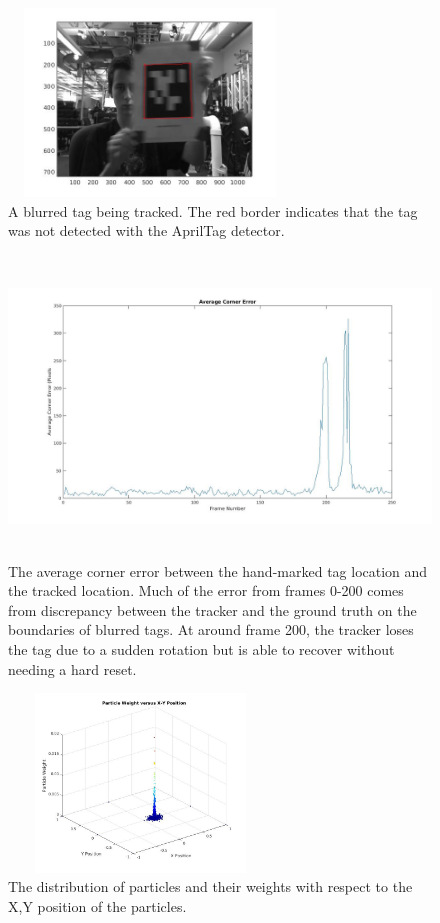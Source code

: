 \documentclass[letterpaper, 10 pt, conference]{ieeeconf}
\begin{document}
\begin{figure}[b]
	\centering
	\includegraphics[width=7.5cm,height=5cm]{tracked_tag}
	\caption{A blurred tag being tracked. The red border indicates that the tag was not detected with the AprilTag detector.}
\end{figure}

\begin{figure}[t]
	\label{fig:error}
	\includegraphics[width=\textwidth,height=8cm]{Average_Error}
	\caption{The average corner error between the hand-marked tag location and the tracked location. Much of the error from frames 0-200 comes from discrepancy between the tracker and the ground truth on the boundaries of blurred tags. At around frame 200, the tracker loses the tag due to a sudden rotation but is able to recover without needing a hard reset.}
\end{figure}

\begin{figure}[b]
	\centering
	\includegraphics[width=7cm,height=4.75cm]{Particles2}
	\caption{The distribution of particles and their weights with respect to the X,Y position of the particles.}
\end{figure}
\end{document}
